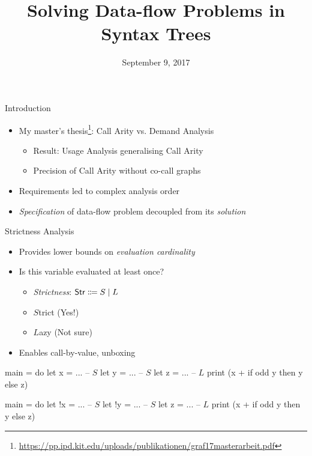 \documentclass{haskellbeamer}
\title{Solving Data-flow Problems in Syntax Trees}
\date{September 9, 2017}
\begin{document}
\maketitle

\begin{frame}{Introduction}
  \begin{itemize}
    \item My master's thesis\footnote{\tiny\url{https://pp.ipd.kit.edu/uploads/publikationen/graf17masterarbeit.pdf}}: Call Arity vs. Demand Analysis
      \begin{itemize}
        \item Result: Usage Analysis generalising Call Arity
        \item Precision of Call Arity without co-call graphs
      \end{itemize}
    \item Requirements led to complex analysis order
    \item \emph{Specification} of data-flow problem decoupled from its \emph{solution}
  \end{itemize}
\end{frame}

\begin{frame}[fragile]{Strictness Analysis}
  \begin{itemize}
    \item Provides lower bounds on \emph{evaluation cardinality}
    \item Is this variable evaluated at least once?
      \begin{itemize}
        \item \emph{Strictness}: $\text{\textsf{Str}} \Coloneqq S \mid L$
        \item $S$trict (Yes!)
        \item $L$azy (Not sure)
      \end{itemize}
    \item Enables call-by-value, unboxing
  \end{itemize}
  \begin{center}
    \begin{minipage}{0.7\textwidth}
      \begin{overprint}
        \begin{haskell}
          main = do
            let  x = ... -- $S$
            let  y = ... -- $S$
            let  z = ... -- $L$
            print (x + if odd y then y else z)
        \end{haskell}
        \begin{haskell}
          main = do
            let !x = ... -- $S$
            let !y = ... -- $S$
            let  z = ... -- $L$
            print (x + if odd y then y else z)
        \end{haskell}
      \end{overprint}
    \end{minipage}
  \end{center}
\end{frame}
\end{document}
